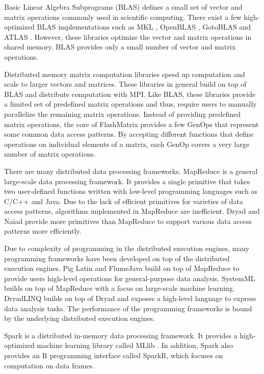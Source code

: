 Basic Linear Algebra Subprograms (BLAS) defines a small set of vector and
matrix operations commonly used in scientific computing. There exist a few
high-optimized BLAS implementations such as MKL \cite{mkl}, OpenBLAS
\cite{openblas}, GotoBLAS \cite{Goto} and ATLAS \cite{atlas}. However, these
libraries optimize the vector and matrix operations in shared memory. BLAS
provides only a small number of vector and matrix operations.

Distributed memory matrix computation libraries \cite{trilinos, petsc, elemental}
speed up computation and scale to larger vectors and matrices. These libraries
in general build on top of BLAS and distribute computation with MPI. Like BLAS,
these libraries provide a limited set of predefined matrix operations and thus,
require users to manually parallelize the remaining matrix operations. Instead
of providing predefined matrix operations, the core of FlashMatrix provides
a few GenOps that represent some common data access patterns. By accepting
different functions that define operations on individual elements of a matrix,
each GenOp covers a very large number of matrix operations.

There are many distributed data processing frameworks.
MapReduce \cite{mapreduce} is a general large-scale data processing framework.
It provides a single primitive that takes two user-defined functions written with
low-level programming languages such as C/C++ and Java. Due to the lack of
efficient primitives for varieties of data access patterns, algorithms
implemented in MapReduce are inefficient. Dryad \cite{dryad} and
Naiad \cite{naiad} provide more primitives than MapReduce to support various
data access patterns more efficiently.

Due to complexity of programming in the distributed execution engines, many
programming frameworks have been developed on top of the distributed execution
engines. Pig Latin \cite{pig} and FlumeJava \cite{flumejava} build
on top of MapReduce to provide users high-level operations for
general-purpose data analysis. SystemML \cite{systemml} builds
on top of MapReduce with a focus on large-scale machine learning.
DryadLINQ \cite{dryadlinq} builds on top of Dryad and exposes a high-level
language to express data analysis tasks. The performance of the programming
frameworks is bound by the underlying distributed execution engines.

Spark \cite{spark} is a distributed in-memory data processing framework.
It provides a high-optimized machine learning library called MLlib \cite{mllib}.
In addition, Spark also provides an R programming interface called SparkR, which
focuses on computation on data frames.

